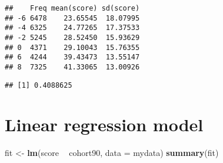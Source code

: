 \documentclass[]{article}
\newenvironment{Shaded}{\begin{snugshade}}{\end{snugshade}}
\newcommand{\KeywordTok}[1]{\textcolor[rgb]{0.13,0.29,0.53}{\textbf{#1}}}
\newcommand{\DataTypeTok}[1]{\textcolor[rgb]{0.13,0.29,0.53}{#1}}
\newcommand{\StringTok}[1]{\textcolor[rgb]{0.31,0.60,0.02}{#1}}
\newcommand{\OperatorTok}[1]{\textcolor[rgb]{0.81,0.36,0.00}{\textbf{#1}}}
\newcommand{\NormalTok}[1]{#1}
\begin{document}
\begin{Shaded}
\end{Shaded}

\begin{verbatim}
##    Freq mean(score) sd(score)
## -6 6478    23.65545  18.07995
## -4 6325    24.77265  17.37533
## -2 5245    28.52450  15.93629
## 0  4371    29.10043  15.76355
## 6  4244    39.43473  13.55147
## 8  7325    41.33065  13.00926
\end{verbatim}

\begin{Shaded}
\end{Shaded}

\begin{verbatim}
## [1] 0.4088625
\end{verbatim}

\section{Linear regression model}\label{linear-regression-model}

\begin{Shaded}
\begin{Highlighting}[]
\NormalTok{fit <-}\StringTok{ }\KeywordTok{lm}\NormalTok{(score }\OperatorTok{~}\StringTok{ }\NormalTok{cohort90, }\DataTypeTok{data =}\NormalTok{ mydata)}
\KeywordTok{summary}\NormalTok{(fit)}
\end{Highlighting}
\end{Shaded}
\end{document}
